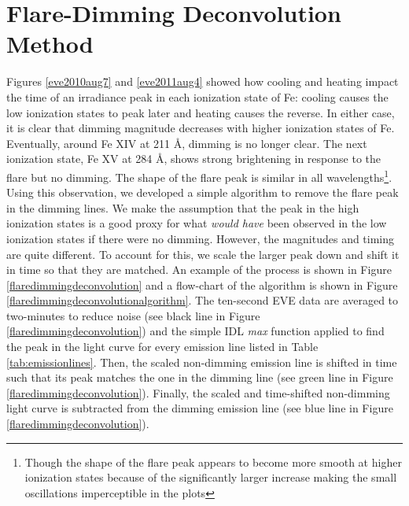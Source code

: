 \section{Flare-Dimming Deconvolution Method}
\label{sec:deconvolve}
Figures \ref{eve2010aug7} and \ref{eve2011aug4} showed how cooling and heating impact the time of an irradiance peak in each ionization state of Fe: cooling causes the low ionization states to peak later and heating causes the reverse. In either case, it is clear that dimming magnitude decreases with higher ionization states of Fe. Eventually, around Fe XIV at 211 \AA, dimming is no longer clear. The next ionization state, Fe XV at 284 \AA, shows strong brightening in response to the flare but no dimming. The shape of the flare peak is similar in all wavelengths\footnote{Though the shape of the flare peak appears to become more smooth at higher ionization states because of the significantly larger increase making the small oscillations imperceptible in the plots}. Using this observation, we developed a simple algorithm to remove the flare peak in the dimming lines. We make the assumption that the peak in the high ionization states is a good proxy for what \textit{would have} been observed in the low ionization states if there were no dimming. However, the magnitudes and timing are quite different. To account for this, we scale the larger peak down and shift it in time so that they are matched. An example of the process is shown in Figure \ref{flaredimmingdeconvolution} and a flow-chart of the algorithm is shown in Figure \ref{flaredimmingdeconvolutionalgorithm}. The ten-second EVE data are averaged to two-minutes to reduce noise (see black line in Figure \ref{flaredimmingdeconvolution}) and the simple IDL \textit{max} function applied to find the peak in the light curve for every emission line listed in Table \ref{tab:emissionlines}. Then, the scaled non-dimming emission line is shifted in time such that its peak matches the one in the dimming line (see green line in Figure \ref{flaredimmingdeconvolution}). Finally, the scaled and time-shifted non-dimming light curve is subtracted from the dimming emission line (see blue line in Figure \ref{flaredimmingdeconvolution}). 

